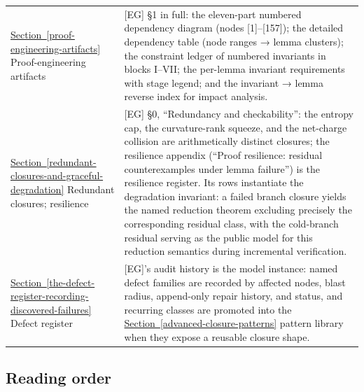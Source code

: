 \documentclass[
  11pt,
]{article}
\theoremstyle{definition}
\newcommand{\secref}[1]{\hyperref[#1]{Section~\ref*{#1}}}
\begin{document}
\begin{longtable}[]{@{}
  >{\raggedright\arraybackslash}p{}
  >{\raggedright\arraybackslash}p{}@{}}
\secref{proof-engineering-artifacts} Proof-engineering artifacts & {[}EG{]} §1 in full: the
eleven-part numbered dependency diagram (nodes {[}1{]}--{[}157{]}); the
detailed dependency table (node ranges → lemma clusters); the constraint
ledger of numbered invariants in blocks I--VII; the per-lemma invariant
requirements with stage legend; and the invariant → lemma reverse index
for impact analysis. \\
\secref{redundant-closures-and-graceful-degradation} Redundant closures; resilience & {[}EG{]} §0, ``Redundancy and
checkability'': the entropy cap, the curvature-rank squeeze, and the
net-charge collision are arithmetically distinct closures; the
resilience appendix (``Proof resilience: residual counterexamples under
lemma failure'') is the resilience register. Its rows instantiate the
degradation invariant: a failed branch closure yields the named
reduction theorem excluding precisely the corresponding residual class,
with the cold-branch residual serving as the public model for this
reduction semantics during incremental verification. \\
\secref{the-defect-register-recording-discovered-failures} Defect register & {[}EG{]}'s audit history is the model
instance: named defect families are recorded by affected nodes, blast
radius, append-only repair history, and status, and recurring classes are
promoted into the \secref{advanced-closure-patterns} pattern library when they expose a
reusable closure shape. \\
\end{longtable}

\subsection{Reading order}\label{b.4-reading-order}
\end{document}
